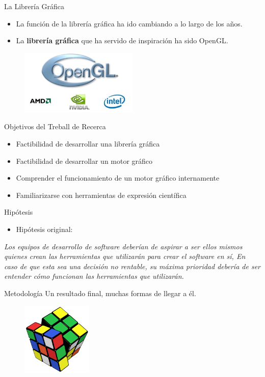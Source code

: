 \documentclass{beamer}
\begin{document}
\begin{frame}{La Librería Gráfica}
  \begin{itemize}
  \item{La función de la librería gráfica ha ido cambiando a lo largo de los años.}
  \item{La \textbf{librería gráfica} que ha servido de inspiración ha sido OpenGL.}
  \end{itemize}
  \vfill
  \begin{figure}
    \centering
    \includegraphics[width=0.5\textwidth]{img/OpenGL-Logo}
  \end{figure}
\end{frame}



\begin{frame}{Objetivos del Treball de Recerca}
  \begin{itemize}
    \item{Factibilidad de desarrollar una librería gráfica}
    \item{Factibilidad de desarrollar un motor gráfico}
    \item{Comprender el funcionamiento de un motor gráfico internamente}
    \item{Familiarizarse con herramientas de expresión científica}
  \end{itemize}
\end{frame}

\begin{frame}{Hipótesis}
  \begin{itemize}
    \item{Hipótesis original:}
  \end{itemize}
  \textit{Los equipos de desarrollo de software deberían de aspirar a ser ellos mismos quienes crean las herramientas que utilizarán para crear el software en sí, En caso de que esta sea una decisión no rentable, su máxima prioridad debería de ser entender cómo funcionan las herramientas que utilizarán.}
\end{frame}

\begin{frame}{Metodología}
  Un resultado final, muchas formas de llegar a él.
  \vfill
  \begin{figure} [h]
    \centering
    \includegraphics[width=0.3\textwidth]{img/rubik}
  \end{figure}
\end{frame}
\end{document}
